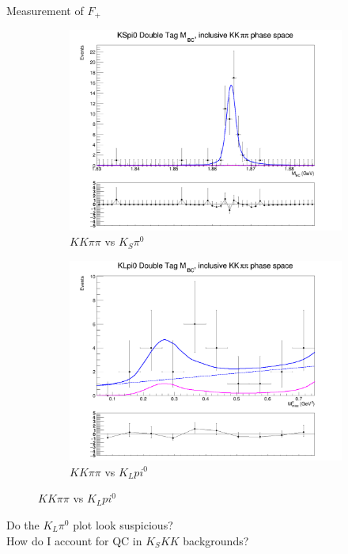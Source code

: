\documentclass{beamer}
\begin{document}
\begin{frame}{Measurement of $F_+$}
  \begin{figure}
    \centering
    \begin{subfigure}{0.38\textwidth}
      \centering
      \includegraphics[width=\textwidth]{Plots/DoubleTagYield_DoubleTag_CP_KKpipi_vs_KSpi0_SignalBin0.png}
      \caption{$KK\pi\pi$ vs $K_S\pi^0$}
    \end{subfigure}%
    \begin{subfigure}{0.38\textwidth}
      \centering
      \includegraphics[width=\textwidth]{Plots/DoubleTagYield_DoubleTag_CP_KKpipi_vs_KLpi0_SignalBin0.png}
      \caption{$KK\pi\pi$ vs $K_Lpi^0$}
    \end{subfigure}
  \end{figure}
  \begin{center}
    Do the $K_L\pi^0$ plot look suspicious? \\
    How do I account for QC in $K_SKK$ backgrounds?
  \end{center}
\end{frame}
\end{document}

